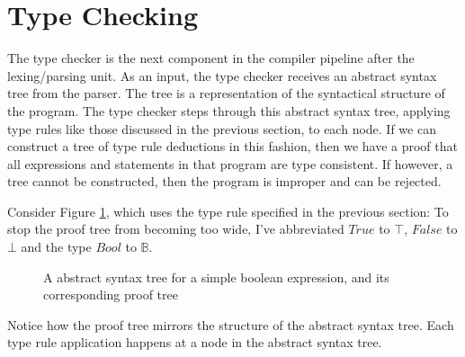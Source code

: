 \documentclass{UoYCSproject}
\begin{document}
\section{Type Checking}
\label{sec:Chap1TypeChecking}
The type checker is the next component in the compiler pipeline after the
lexing/parsing unit. As an input, the type checker receives an abstract syntax
tree from the parser. The tree is a representation of the syntactical structure
of the program. The type checker steps through this abstract syntax tree, applying
type rules like those discussed in the previous section, to each node. If we
can construct a tree of type rule deductions in this fashion, then we have a
proof that all expressions and statements in that program are type consistent.
If however, a tree cannot be constructed, then the program is improper and
can be rejected.

Consider Figure \ref{fig:ParseAndProofTree}, which uses the
type rule specified in the previous section:
To stop the proof tree from becoming too wide, I've abbreviated $True$ to $\top$,
$False$ to $\bot$ and the type $Bool$ to $\mathbb{B}$.
\begin{figure}
    \caption{A abstract syntax tree for a simple boolean expression, and its corresponding proof tree}
    \label{fig:ParseAndProofTree}
\end{figure}
Notice how the proof tree mirrors the structure of the abstract syntax tree.
Each type rule application happens at a node in the abstract syntax tree.
\end{document}
